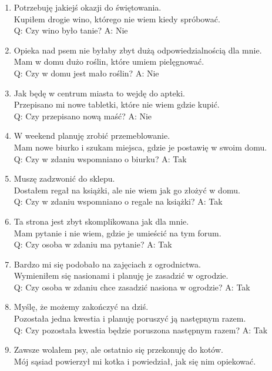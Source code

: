 \begin{enumerate}
	Znalazłem na strychu sejf i nie wiem jak go otworzyć.\\
	Q: Czy według zdania na strychu była skrzynia? A: Nie
\item Potrzebuję jakiejś okazji do świętowania.\\
	Kupiłem drogie wino, którego nie wiem kiedy spróbować.\\
	Q: Czy wino było tanie? A: Nie
\item Opieka nad psem nie byłaby zbyt dużą odpowiedzialnością dla mnie.\\
	Mam w domu dużo roślin, które umiem pielęgnować.\\
	Q: Czy w domu jest mało roślin? A: Nie
\item Jak będę w centrum miasta to wejdę do apteki.\\
	Przepisano mi nowe tabletki, które nie wiem gdzie kupić.\\
	Q: Czy przepisano nową maść? A: Nie
\item W weekend planuję zrobić przemeblowanie.\\
	Mam nowe biurko i szukam miejsca, gdzie je postawię w swoim domu.\\
	Q: Czy w zdaniu wspomniano o biurku? A: Tak
\item Muszę zadzwonić do sklepu.\\
	Dostałem regał na książki, ale nie wiem jak go złożyć w domu.\\
	Q: Czy w zdaniu wspomniano o regale na książki? A: Tak
\item Ta strona jest zbyt skomplikowana jak dla mnie.\\
	Mam pytanie i nie wiem, gdzie je umieścić na tym forum.\\
	Q: Czy osoba w zdaniu ma pytanie? A: Tak
\item Bardzo mi się podobało na zajęciach z ogrodnictwa.\\
	Wymieniłem się nasionami i planuję je zasadzić w ogrodzie.\\
	Q: Czy osoba w zdaniu chce zasadzić nasiona w ogrodzie? A: Tak
\item Myślę, że możemy zakończyć na dziś.\\
	Pozostała jedna kwestia i planuję poruszyć ją następnym razem.\\
	Q: Czy pozostała kwestia będzie poruszona następnym razem? A: Tak
\item Zawsze wolałem psy, ale ostatnio się przekonuję do kotów.\\
	Mój sąsiad powierzył mi kotka i powiedział, jak się nim opiekować.\\

\end{enumerate}
